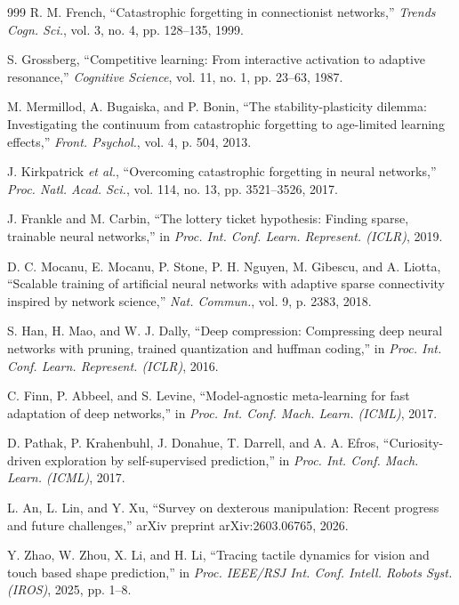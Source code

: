 ﻿\documentclass[11pt,a4paper]{article}
\begin{document}
\begin{thebibliography}{999}
R. M. French, ``Catastrophic forgetting in connectionist networks,'' \textit{Trends Cogn. Sci.}, vol. 3, no. 4, pp. 128--135, 1999.

S. Grossberg, ``Competitive learning: From interactive activation to adaptive resonance,'' \textit{Cognitive Science}, vol. 11, no. 1, pp. 23--63, 1987.

M. Mermillod, A. Bugaiska, and P. Bonin, ``The stability-plasticity dilemma: Investigating the continuum from catastrophic forgetting to age-limited learning effects,'' \textit{Front. Psychol.}, vol. 4, p. 504, 2013.

J. Kirkpatrick \textit{et al.}, ``Overcoming catastrophic forgetting in neural networks,'' \textit{Proc. Natl. Acad. Sci.}, vol. 114, no. 13, pp. 3521--3526, 2017.

J. Frankle and M. Carbin, ``The lottery ticket hypothesis: Finding sparse, trainable neural networks,'' in \textit{Proc. Int. Conf. Learn. Represent. (ICLR)}, 2019.

D. C. Mocanu, E. Mocanu, P. Stone, P. H. Nguyen, M. Gibescu, and A. Liotta, ``Scalable training of artificial neural networks with adaptive sparse connectivity inspired by network science,'' \textit{Nat. Commun.}, vol. 9, p. 2383, 2018.

S. Han, H. Mao, and W. J. Dally, ``Deep compression: Compressing deep neural networks with pruning, trained quantization and huffman coding,'' in \textit{Proc. Int. Conf. Learn. Represent. (ICLR)}, 2016.

C. Finn, P. Abbeel, and S. Levine, ``Model-agnostic meta-learning for fast adaptation of deep networks,'' in \textit{Proc. Int. Conf. Mach. Learn. (ICML)}, 2017.

D. Pathak, P. Krahenbuhl, J. Donahue, T. Darrell, and A. A. Efros, ``Curiosity-driven exploration by self-supervised prediction,'' in \textit{Proc. Int. Conf. Mach. Learn. (ICML)}, 2017.

L. An, L. Lin, and Y. Xu, ``Survey on dexterous manipulation: Recent progress and future challenges,'' arXiv preprint arXiv:2603.06765, 2026.

Y. Zhao, W. Zhou, X. Li, and H. Li, ``Tracing tactile dynamics for vision and touch based shape prediction,'' in \textit{Proc. IEEE/RSJ Int. Conf. Intell. Robots Syst. (IROS)}, 2025, pp. 1--8.


\end{thebibliography}
\end{document}
